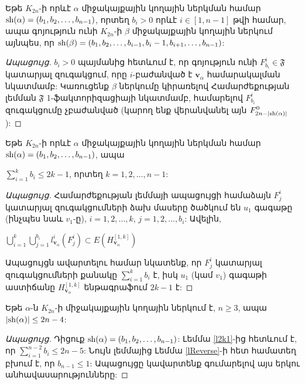 \begin{hide}
\begin{lemma}
\label{lLessColors}
Եթե $K_{2n}$-ի որևէ $\alpha$ միջակայքային կողային ներկման համար ${\rm sh}(\alpha) = (b_1,b_2,\ldots, b_{n-1})$, որտեղ $b_i > 0$ որևէ $i \in [1,n-1]$ թվի համար, ապա գոյություն ունի $K_{2n}$-ի $\beta$ միջակայքային կողային ներկում այնպես, որ ${\rm sh}(\beta) = (b_1, b_2, \ldots, b_{i-1}, b_{i}-1, b_{i+1}, \ldots, b_{n-1})$:
\end{lemma}
\begin{proof}[Ապացույց]
$b_i > 0$ պայմանից հետևում է, որ գոյություն ունի $F_{b_i}^i \in \mathfrak{F}$ կատարյալ զուգակցում, որը $i$-բաժանված է $\mathbf{v}_\alpha$ համարակալման նկատմամբ: Կառուցենք $\beta$ ներկումը կիրառելով Համարժեքության լեմման $\mathfrak{F}$ 1-ֆակտորիզացիայի նկատմամբ, համարելով $F_{b_i}^i$ զուգակցումը չբաժանված (կարող ենք վերանվանել այն $F^0_{2n-|{\rm sh}(\alpha)|}$):
\end{proof}


\begin{lemma}
\label{l2k1}
Եթե $K_{2n}$-ի որևէ $\alpha$ միջակայքային կողային ներկման համար ${\rm sh}(\alpha) = (b_1,b_2,\ldots, b_{n-1})$, ապա
\begin{center}
$\sum\limits_{i=1}^{k}{b_i} \leq 2k-1$, որտեղ $k=1,2,\ldots,n-1$:
\end{center}
\end{lemma}

\begin{proof}[Ապացույց]
Համարժեքության լեմմայի ապացույցի համաձայն $F^i_j$ կատարյալ զուգակցումների ձախ մասերը ծածկում են $u_1$ գագաթը (ինչպես նաև $v_1$-ը), $i=1,2,\ldots,k$, $j=1,2,\ldots,b_i$: Ավելին, 
\begin{center}
$\bigcup\limits_{i=1}^{k}
\bigcup\limits_{j=1}^{b_i}
{l^i_{\mathbf{v}_\alpha}\left(F^i_j\right)} 
\subset E\left(H_{\mathbf{v}_\alpha}^{[1,k]}\right)$
\end{center}
Ապացույցն ավարտելու համար նկատենք, որ $F^i_j$ կատարյալ զուգակցումների քանակը $\sum\limits_{i=1}^{k}{b_i}$ է, իսկ $u_1$ (կամ $v_1$) գագաթի աստիճանը $H_{\mathbf{v}_\alpha}^{[1,k]}$ ենթագրաֆում $2k-1$ է:
\end{proof}
\begin{corollary}
\label{c2n4}
Եթե $\alpha$-ն $K_{2n}$-ի միջակայքային կողային ներկում է, $n\geq 3$, ապա  
$|{\rm sh}(\alpha)| \leq 2n-4$:
\end{corollary}

\begin{proof}[Ապացույց]
Դիցուք ${\rm sh}(\alpha) = (b_1,b_2,\ldots, b_{n-1})$: Լեմմա \ref{l2k1}-ից հետևում է, որ $\sum\limits_{i=1}^{n-2}{b_i} \leq 2n-5$: Նույն լեմմայից Լեմմա \ref{lReverse}-ի հետ համատեղ բխում է, որ $b_{n-1} \leq 1$: Ապացույցը կավարտենք գումարելով այս երկու անհավասարությունները:
\end{proof}


\end{hide}
